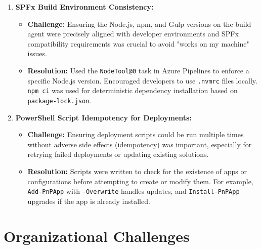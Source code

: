 \begin{enumerate}
    \item \textbf{SPFx Build Environment Consistency:}
    \begin{itemize}
        \item \textbf{Challenge:} Ensuring the Node.js, npm, and Gulp versions on the build agent were precisely aligned with developer environments and SPFx compatibility requirements was crucial to avoid "works on my machine" issues.
        \item \textbf{Resolution:} Used the \texttt{NodeTool@0} task in Azure Pipelines to enforce a specific Node.js version. Encouraged developers to use \texttt{.nvmrc} files locally. \texttt{npm ci} was used for deterministic dependency installation based on \texttt{package-lock.json}.
    \end{itemize}

    \item \textbf{PowerShell Script Idempotency for Deployments:}
    \begin{itemize}
        \item \textbf{Challenge:} Ensuring deployment scripts could be run multiple times without adverse side effects (idempotency) was important, especially for retrying failed deployments or updating existing solutions.
        \item \textbf{Resolution:} Scripts were written to check for the existence of apps or configurations before attempting to create or modify them. For example, \texttt{Add-PnPApp} with \texttt{-Overwrite} handles updates, and \texttt{Install-PnPApp} upgrades if the app is already installed.
    \end{itemize}
\end{enumerate}

\section{Organizational Challenges}
\label{sec:OrganizationalChallenges}

